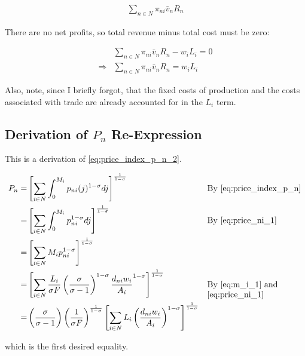 \documentclass[10pt]{article}
\begin{document}
\begin{align}
    \sum_{n \in N} \pi_{n i} \bar{v}_n R_n
\end{align}

There are no net profits, so 
total revenue minus total cost must be zero:

\begin{align}
    &\sum_{n \in N} \pi_{n i} \bar{v}_n R_n - w_i L_i = 0 \\
    \Rightarrow &\sum_{n \in N} \pi_{n i} \bar{v}_n R_n = w_i L_i
\end{align}

Also, note, since I briefly forgot, that the fixed 
costs of production and the costs associated with 
trade are already accounted for in the $L_i$ term.


\subsection{Derivation of $P_n$ Re-Expression}
\label{sec:price_ni_2}

This is a derivation of \eqref{eq:price_index_p_n_2}.

\begin{align}
    P_n = &\left[\sum_{i \in N} \int_0^{M_i} p_{n i}(j)^{1-\sigma} d j\right]^{\frac{1}{1-\sigma}} && \parbox[t]{4cm}{\raggedright By \eqref{eq:price_index_p_n}} \\
    = &\left[\sum_{i \in N} \int_0^{M_i} p_{n i}^{1-\sigma} d j\right]^{\frac{1}{1-\sigma}} && \parbox[t]{4cm}{\raggedright By \eqref{eq:price_ni_1}} \\
    = &\left[\sum_{i \in N} M_i p_{n i}^{1-\sigma}\right]^{\frac{1}{1-\sigma}} \\
    = &\left[\sum_{i \in N} \frac{L_i}{\sigma F} \left(\frac{\sigma}{\sigma-1}\right)^{1-\sigma} \frac{d_{ni} w_i}{A_i}^{1-\sigma}\right]^{\frac{1}{1-\sigma}} && \parbox[t]{4cm}{\raggedright By \eqref{eq:m_i_1} and \eqref{eq:price_ni_1}} \\
    = &\left(\frac{\sigma}{\sigma-1}\right) \left(\frac{1}{\sigma F}\right)^{\frac{1}{1-\sigma}} \left[\sum_{i \in N} L_i \left(\frac{d_{ni} w_i}{A_i}\right)^{1-\sigma}\right]^{\frac{1}{1-\sigma}} \\
\end{align}

which is the first desired equality. 
\end{document}
